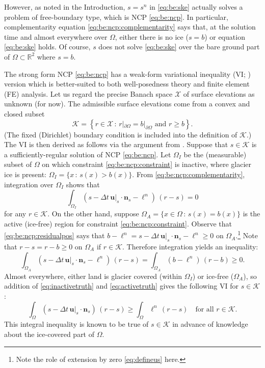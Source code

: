 \documentclass[hidelinks,onefignum,onetabnum,final]{siamart220329}  %
\newcommand{\RR}{\mathbb{R}}
\newcommand{\bn}{\mathbf{n}}
\newcommand{\bu}{\mathbf{u}}
\newcommand{\cK}{\mathcal{K}}
\newcommand{\cX}{\mathcal{X}}
\begin{document}
However, as noted in the Introduction, $s=s^n$ in \eqref{eq:be:ske} actually solves a problem of free-boundary type, which is NCP \eqref{eq:be:ncp}.  In particular, complementarity equation \eqref{eq:be:ncp:complementarity} says that, at the solution time and almost everywhere over $\Omega$, either there is no ice ($s=b$) or equation \eqref{eq:be:ske} holds.  Of course, $s$ does not solve \eqref{eq:be:ske} over the bare ground part of $\Omega \subset \RR^2$ where $s=b$.

The strong form NCP \eqref{eq:be:ncp} has a weak-form variational inequality (VI; \cite{Evans2010,KinderlehrerStampacchia1980}) version which is better-suited to both well-posedness theory and finite element (FE) analysis.  Let us regard the precise Banach space $\cX$ of surface elevations as unknown (for now).  The admissible surface elevations come from a convex and closed subset
\begin{equation}
\cK = \left\{r \in\cX\,:\,r|_{\partial\Omega}=b|_{\partial\Omega} \text{ and } r \ge b\right\}.  \label{eq:be:admissible}
\end{equation}
(The fixed (Dirichlet) boundary condition is included into the definition of $\cK$.)  The VI is then derived as follows via the argument from \cite{Bueler2021conservation}.  Suppose that $s \in \cK$ is a sufficiently-regular solution of NCP \eqref{eq:be:ncp}.  Let $\Omega_I$ be the (measurable) subset of $\Omega$ on which constraint \eqref{eq:be:ncp:constraint} is inactive, where glacier ice is present: $\Omega_I = \{x\,:\,s(x)>b(x)\}$.  From \eqref{eq:be:ncp:complementarity}, integration over $\Omega_I$ shows that
\begin{equation}
\int_{\Omega_I} \left(s - \Delta t\,\bu|_s \cdot \bn_s - \ell^n\right)\,(r-s) = 0  \label{eq:inactivetruth}
\end{equation}
for any $r\in\cK$.  On the other hand, suppose $\Omega_A = \{x \in \Omega \,:\,s(x)=b(x)\}$ is the active (ice-free) region for constraint \eqref{eq:be:ncp:constraint}.  Observe that \eqref{eq:be:ncp:residualpos} says that $b-\ell^n = s - \Delta t\,\bu|_s \cdot \bn_s - \ell^n \ge 0$ on $\Omega_A$.\footnote{Note the role of extension by zero \eqref{eq:defineus} here.}  Note that $r-s=r-b\ge 0$ on $\Omega_A$ if $r\in\cK$.  Therefore integration yields an inequality:
\begin{equation}
\int_{\Omega_A} \left(s - \Delta t\,\bu|_s \cdot \bn_s - \ell^n\right)\,(r-s) = \int_{\Omega_A} \left(b - \ell^n\right)\,(r-b) \ge 0.  \label{eq:activetruth}
\end{equation}
Almost everywhere, either land is glacier covered (within $\Omega_I$) or ice-free ($\Omega_A$), so addition of \eqref{eq:inactivetruth} and \eqref{eq:activetruth} gives the following VI for $s \in \cK$:
\begin{equation}
\int_\Omega \left(s - \Delta t\,\bu|_s \cdot \bn_s\right)\,(r-s) \ge \int_\Omega \ell^n \,(r-s) \quad \text{for all } r \in \cK. \label{eq:be:viearly}
\end{equation}
This integral inequality is known to be true of $s\in\cK$ in advance of knowledge about the ice-covered part of $\Omega$.
	
\end{document}
